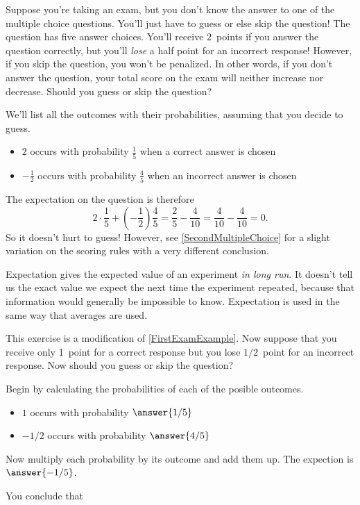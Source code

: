 \documentclass{ximera}
\begin{document}
\begin{example}\label{FirstExamExample}
Suppose you're taking an exam, but you
don't know the answer to one of the
multiple choice questions. You'll just have to guess or
else skip the question!
The question has five answer choices. You'll receive
$2$~points if you answer the question correctly,
but you'll {\em lose}
a half point for an incorrect response!
However, if you skip the question, you won't be penalized.
In other words, if you don't answer the question, your total
score on the exam will neither increase nor decrease.
Should you guess or skip the question?

We'll list all the outcomes with their probabilities,
assuming that you decide to guess.
\begin{itemize}
\item $2$ occurs with probability $\frac{1}{5}$ when
a correct answer is chosen
\item $-\frac{1}{2}$ occurs with probability $\frac{4}{5}$
when an incorrect answer is chosen
\end{itemize}
The expectation on the question is therefore
\[2\cdot\frac{1}{5}+\left(-\frac{1}{2}\right)\frac{4}{5}
=\frac{2}{5}-\frac{4}{10}
=\frac{4}{10}-\frac{4}{10}
=0.\]
So it doesn't hurt to guess!
However, see \autoref{SecondMultipleChoice} for a slight
variation on the scoring rules
with a very different conclusion.
\end{example}

\begin{remark}
Expectation gives
the expected value of an experiment {\em in long run}.
It doesn't tell us the exact value we expect
the next time the experiment repeated, because that
information would generally be impossible to know.
Expectation is used in the same way that averages are used.
\end{remark}

\begin{exercise}
This exercise is a modification of \autoref{FirstExamExample}.
Now suppose that you receive only 1~point
for a correct response
but you lose $1/2$~point for an incorrect response.
Now should you guess or skip the question?

Begin by calculating the probabilities of each of the posible outcomes.
\begin{itemize}
\item $1$ occurs with probability $\answer{1/5}$
\item $-1/2$ occurs with probability $\answer{4/5}$
\end{itemize}

Now multiply each probability by its outcome and add them up.
The expection is $\answer{-1/5}$.

You conclude that
\begin{multipleChoice}
\end{multipleChoice}
\end{exercise}
\end{document}
